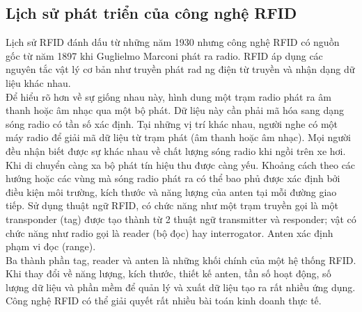 \subsection{Lịch sử phát triển của công nghệ RFID}
Lịch sử RFID đánh dấu từ những năm 1930 nhưng công nghệ RFID có nguồn gốc từ năm 1897 khi Guglielmo Marconi phát ra radio. RFID áp dụng các nguyên tắc vật lý cơ bản như truyền phát rad ng điện từ truyền và nhận dạng dữ liệu khác nhau.\\
Để hiểu rõ hơn về sự giống nhau này, hình dung một trạm radio phát ra âm thanh hoặc âm nhạc qua một bộ phát. Dữ liệu này cần phải mã hóa sang dạng sóng radio có tần số xác định. Tại những vị trí khác nhau, người nghe có một máy radio để giải mã dữ liệu từ trạm phát (âm thanh hoặc âm nhạc). Mọi người đều nhận biết được sự khác nhau về chất lượng sóng radio khi ngồi trên xe hơi. Khi di chuyển càng xa bộ phát tín hiệu thu được càng yếu. Khoảng cách theo các hướng hoặc các vùng mà sóng radio phát ra có thể bao phủ được xác định bởi điều kiện môi trường, kích thước và năng lượng của anten tại mỗi đường giao tiếp. Sử dụng thuật ngữ RFID, có chức năng như một trạm truyền gọi là một transponder (tag) được tạo thành từ 2 thuật ngữ transmitter và responder; vật có chức năng như radio gọi là reader (bộ đọc) hay interrogator. Anten xác định phạm vi đọc (range).\\
Ba thành phần tag, reader và anten là những khối chính của một hệ thống RFID. Khi thay đổi về năng lượng, kích thước, thiết kế anten, tần số hoạt động, số lượng dữ liệu và phần mềm để quản lý và xuất dữ liệu tạo ra rất nhiều ứng dụng. Công nghệ RFID có thể giải quyết rất nhiều bài toán kinh doanh thực tế.
